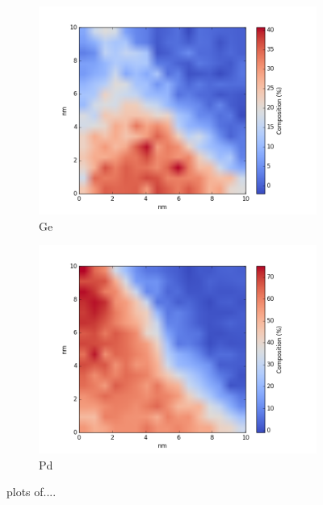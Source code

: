 \begin{figure}
\begin{subfigure}{0.5\textwidth}
		\includegraphics[width=\textwidth]{fig/q/D_heatedGeKline/Ge_zetaAbs}
		\caption{Ge}
		\label{fig:Dge}
	\end{subfigure}%
	\hfill
	\begin{subfigure}{0.5\textwidth}
		\includegraphics[width=\textwidth]{fig/q/D_heatedGeKline/Pd_zetaAbs}
		\caption{Pd}
		\label{fig:Dpd}
	\end{subfigure}
	\caption{plots of....}
	\label{fig:D}
\end{figure}

